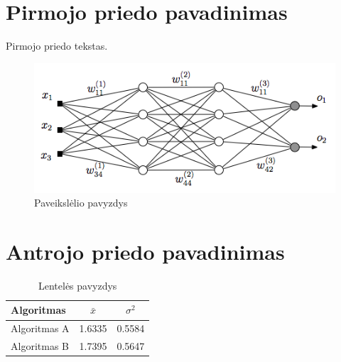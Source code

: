 \documentclass[fleqn]{VUMIFKompMagistrinis}
\begin{document}
\section{Pirmojo priedo pavadinimas}
Pirmojo priedo tekstas.
\begin{figure}[H]
    \centering
    \includegraphics[scale=0.5]{img/MLP}
    \caption{Paveikslėlio pavyzdys}
    \label{img:mlp}
\end{figure}


\section{Antrojo priedo pavadinimas}
\begin{table}[H]\footnotesize
  \centering
  \caption{Lentelės pavyzdys}
  \begin{tabular}{|l|c|c|} \hline
    Algoritmas    & $\bar{x}$ & $\sigma^{2}$ \\
    \hline
    Algoritmas A  & 1.6335    & 0.5584 \\
    Algoritmas B  & 1.7395    & 0.5647 \\
    \hline
  \end{tabular}
  \label{tab:table example}
\end{table}
\end{document}
